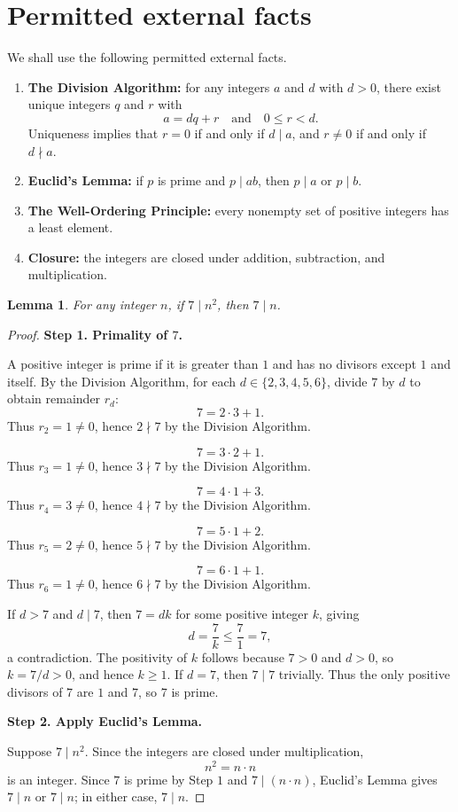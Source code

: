 \documentclass{article}
\newtheorem{lemma}{Lemma}
\begin{document}
\section*{Permitted external facts}

We shall use the following permitted external facts.

\begin{enumerate}
    \item \textbf{The Division Algorithm:} for any integers $a$ and $d$ with $d>0$, there exist unique integers $q$ and $r$ with
    \[
        a=dq+r
        \quad\text{and}\quad
        0\le r<d.
    \]
    Uniqueness implies that $r=0$ if and only if $d\mid a$, and $r\neq 0$ if and only if $d\nmid a$.

    \item \textbf{Euclid's Lemma:} if $p$ is prime and $p\mid ab$, then $p\mid a$ or $p\mid b$.

    \item \textbf{The Well-Ordering Principle:} every nonempty set of positive integers has a least element.

    \item \textbf{Closure:} the integers are closed under addition, subtraction, and multiplication.
\end{enumerate}

\begin{lemma}
For any integer $n$, if $7\mid n^2$, then $7\mid n$.
\end{lemma}

\begin{proof}
\textbf{Step 1. Primality of $7$.}

A positive integer is prime if it is greater than $1$ and has no divisors except $1$ and itself. By the Division Algorithm, for each $d\in\{2,3,4,5,6\}$, divide $7$ by $d$ to obtain remainder $r_d$:
\[
    7=2\cdot 3+1.
\]
Thus $r_2=1\neq 0$, hence $2\nmid 7$ by the Division Algorithm.

\[
    7=3\cdot 2+1.
\]
Thus $r_3=1\neq 0$, hence $3\nmid 7$ by the Division Algorithm.

\[
    7=4\cdot 1+3.
\]
Thus $r_4=3\neq 0$, hence $4\nmid 7$ by the Division Algorithm.

\[
    7=5\cdot 1+2.
\]
Thus $r_5=2\neq 0$, hence $5\nmid 7$ by the Division Algorithm.

\[
    7=6\cdot 1+1.
\]
Thus $r_6=1\neq 0$, hence $6\nmid 7$ by the Division Algorithm.

If $d>7$ and $d\mid 7$, then $7=dk$ for some positive integer $k$, giving
\[
    d=\frac{7}{k}\le \frac{7}{1}=7,
\]
a contradiction. The positivity of $k$ follows because $7>0$ and $d>0$, so $k=7/d>0$, and hence $k\ge 1$. If $d=7$, then $7\mid 7$ trivially. Thus the only positive divisors of $7$ are $1$ and $7$, so $7$ is prime.

\textbf{Step 2. Apply Euclid's Lemma.}

Suppose $7\mid n^2$. Since the integers are closed under multiplication,
\[
    n^2=n\cdot n
\]
is an integer. Since $7$ is prime by Step $1$ and $7\mid (n\cdot n)$, Euclid's Lemma gives $7\mid n$ or $7\mid n$; in either case, $7\mid n$.
\end{proof}
\end{document}
